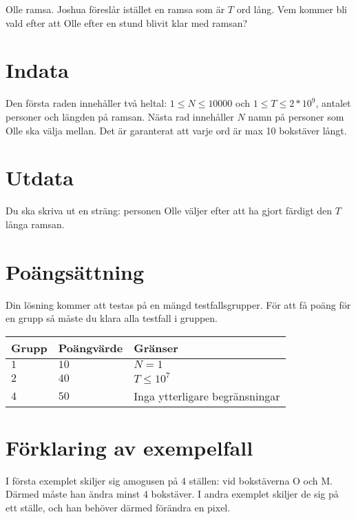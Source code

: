 Olle ramsa. 
Joshua föreslår istället en ramsa som är $T$ ord lång. Vem kommer bli vald efter att Olle efter en stund blivit klar med ramsan?

\section*{Indata}
Den första raden innehåller två heltal: $1 \leq N \leq 10000$ och $1\leq T \leq 2*10^9$, antalet personer och längden på ramsan.
Nästa rad innehåller $N$ namn på personer som Olle ska välja mellan.
Det är garanterat att varje ord är max 10 bokstäver långt.

\section*{Utdata}
Du ska skriva ut en sträng: personen Olle väljer efter att ha gjort färdigt den $T$ långa ramsan.

\section*{Poängsättning}
Din lösning kommer att testas på en mängd testfallsgrupper.
För att få poäng för en grupp så måste du klara alla testfall i gruppen.

\noindent
\begin{tabular}{| l | l | p{12cm} |}
  \hline
  Grupp & Poängvärde & Gränser \\ \hline
  $1$   & $10$       & $N=1$ \\ \hline
  $2$   & $40$       & $T \leq 10^7$ \\ \hline
  $4$   & $50$       & Inga ytterligare begränsningar \\ \hline
\end{tabular}

\section*{Förklaring av exempelfall}
I första exemplet skiljer sig amogusen på 4 ställen: vid bokstäverna O och M. Därmed måste han ändra minst 4 bokstäver.
I andra exemplet skiljer de sig på ett ställe, och han behöver därmed förändra en pixel.